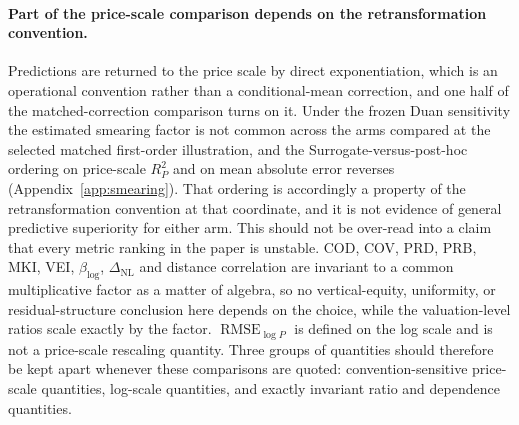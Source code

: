 \documentclass[10pt]{article}
\theoremstyle{definition}
\newcommand{\1}{\mathbf{1}}
\begin{document}
\paragraph{Part of the price-scale comparison depends on the retransformation
convention.}
Predictions are returned to the price scale by direct exponentiation, which is an
operational convention rather than a conditional-mean correction, and one half of the
matched-correction comparison turns on it. Under the frozen Duan sensitivity the estimated smearing
factor is not common across the arms compared at the selected matched first-order illustration, and
the Surrogate-versus-post-hoc ordering on price-scale $R^2_P$ and on mean absolute error reverses
(Appendix~\ref{app:smearing}). That ordering is accordingly a property of the retransformation
convention at that coordinate, and it is not evidence of general predictive superiority for either
arm. This should not be over-read into a claim that every metric ranking in the paper is unstable.
COD, COV, PRD, PRB, MKI, VEI, $\beta_{\log}$, $\Delta_{\mathrm{NL}}$ and distance correlation are
invariant to a common multiplicative factor as a matter of algebra, so no vertical-equity,
uniformity, or residual-structure conclusion here depends on the choice, while the valuation-level
ratios scale exactly by the factor. $\operatorname{RMSE}_{\log P}$ is defined on the log scale and
is not a price-scale rescaling quantity. Three groups of quantities should therefore be kept apart
whenever these comparisons are quoted: convention-sensitive price-scale quantities, log-scale
quantities, and exactly invariant ratio and dependence quantities.
\end{document}
